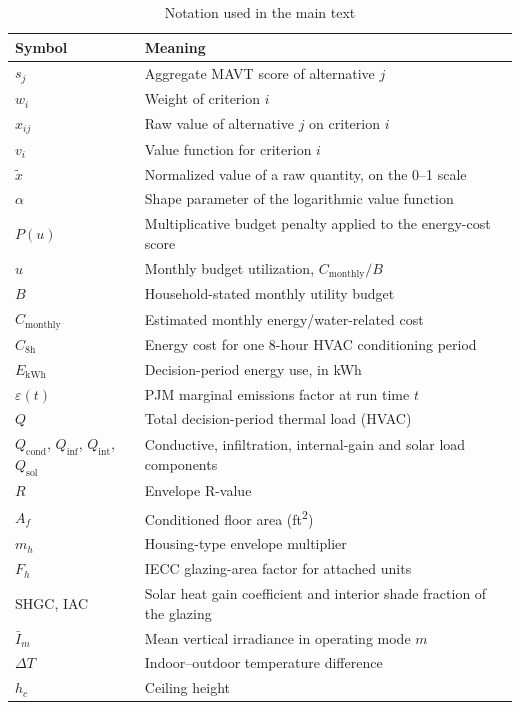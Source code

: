 \documentclass[11pt]{article}
\begin{document}
\begin{table}[htbp]
\centering
\footnotesize
\caption{Notation used in the main text}
\label{tab:notation}
\renewcommand{\arraystretch}{1.1}
\begin{tabular}{@{}ll@{}}
\toprule
Symbol & Meaning \\
\midrule
$s_j$ & Aggregate MAVT score of alternative $j$ \\
$w_i$ & Weight of criterion $i$ \\
$x_{ij}$ & Raw value of alternative $j$ on criterion $i$ \\
$v_i$ & Value function for criterion $i$ \\
$\tilde{x}$ & Normalized value of a raw quantity, on the 0--1 scale \\
$\alpha$ & Shape parameter of the logarithmic value function \\
$P(u)$ & Multiplicative budget penalty applied to the energy-cost score \\
$u$ & Monthly budget utilization, $C_{\mathrm{monthly}} / B$ \\
$B$ & Household-stated monthly utility budget \\
$C_{\mathrm{monthly}}$ & Estimated monthly energy/water-related cost \\
$C_{\mathrm{8h}}$ & Energy cost for one 8-hour HVAC conditioning period \\
$E_{\mathrm{kWh}}$ & Decision-period energy use, in kWh \\
$\varepsilon(t)$ & PJM marginal emissions factor at run time $t$ \\
$Q$ & Total decision-period thermal load (HVAC) \\
$Q_{\mathrm{cond}}$, $Q_{\mathrm{inf}}$, $Q_{\mathrm{int}}$, $Q_{\mathrm{sol}}$ & Conductive, infiltration, internal-gain and solar load components \\
$R$ & Envelope R-value \\
$A_f$ & Conditioned floor area (ft\textsuperscript{2}) \\
$m_h$ & Housing-type envelope multiplier \\
$F_h$ & IECC glazing-area factor for attached units \\
SHGC, IAC & Solar heat gain coefficient and interior shade fraction of the glazing \\
$\bar{I}_m$ & Mean vertical irradiance in operating mode $m$ \\
$\Delta T$ & Indoor--outdoor temperature difference \\
$h_c$ & Ceiling height \\

\end{tabular}
\end{table}
\end{document}
